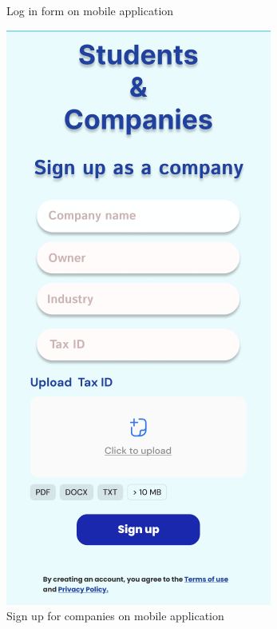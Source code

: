 \begin{figure}[ht]
\begin{minipage}[b]{0.45\textwidth}
        \caption{Log in form on mobile application}
        \label{fig:image0}
    \end{minipage}
    \hfill
    \begin{minipage}[b]{0.45\textwidth}
        \centering
        \includegraphics[width=\textwidth]{RASD-Latex/assets/UI images/signup_company_phone.png}
        \caption{Sign up for companies on mobile application}
        \label{fig:image1}
    \end{minipage}
\end{figure}


